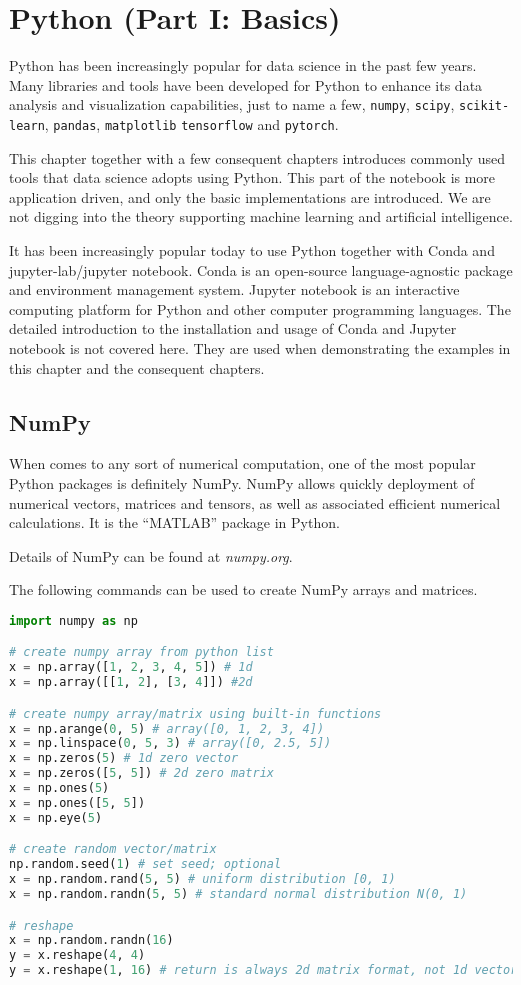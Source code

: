 \chapter{Python (Part I: Basics)} \label{ch:numpyscipy}

Python has been increasingly popular for data science in the past few years. Many libraries and tools have been developed for Python to enhance its data analysis and visualization capabilities, just to name a few, \verb|numpy|, \verb|scipy|, \verb|scikit-learn|, \verb|pandas|, \verb|matplotlib| \verb|tensorflow| and \verb|pytorch|.

This chapter together with a few consequent chapters introduces commonly used tools that data science adopts using Python. This part of the notebook is more application driven, and only the basic implementations are introduced. We are not digging into the theory supporting machine learning and artificial intelligence.

It has been increasingly popular today to use Python together with Conda and jupyter-lab/jupyter notebook. Conda is an open-source language-agnostic package and environment management system. Jupyter notebook is an interactive computing platform for Python and other computer programming languages. The detailed introduction to the installation and usage of Conda and Jupyter notebook is not covered here. They are used when demonstrating the examples in this chapter and the consequent chapters.

\section{NumPy}

When comes to any sort of numerical computation, one of the most popular Python packages is definitely NumPy. NumPy allows quickly deployment of numerical vectors, matrices and tensors, as well as associated efficient numerical calculations. It is the ``MATLAB'' package in Python.

Details of NumPy can be found at \textit{numpy.org}.

The following commands can be used to create NumPy arrays and matrices.
\begin{lstlisting}[language=Python]
import numpy as np

# create numpy array from python list
x = np.array([1, 2, 3, 4, 5]) # 1d
x = np.array([[1, 2], [3, 4]]) #2d

# create numpy array/matrix using built-in functions
x = np.arange(0, 5) # array([0, 1, 2, 3, 4])
x = np.linspace(0, 5, 3) # array([0, 2.5, 5])
x = np.zeros(5) # 1d zero vector
x = np.zeros([5, 5]) # 2d zero matrix
x = np.ones(5)
x = np.ones([5, 5])
x = np.eye(5)

# create random vector/matrix
np.random.seed(1) # set seed; optional
x = np.random.rand(5, 5) # uniform distribution [0, 1)
x = np.random.randn(5, 5) # standard normal distribution N(0, 1)

# reshape
x = np.random.randn(16)
y = x.reshape(4, 4)
y = x.reshape(1, 16) # return is always 2d matrix format, not 1d vector format
\end{lstlisting}


